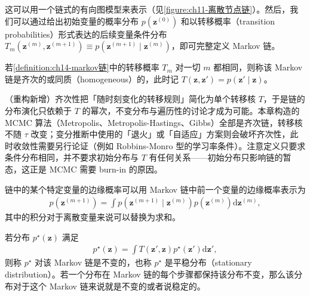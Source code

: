 \documentclass[../../main.tex]{subfiles}
\begin{document}
这可以用一个链式的有向图模型来表示（见\cref{figure:ch11-离散节点链}）。然后，我们可以通过给出初始变量的概率分布 $p\!\left(\bm{z}^{(0)}\right)$ 和以转移概率（transition probabilities）形式表达的后续变量条件分布 $T_{m}\!\left(\bm{z}^{(m)},\bm{z}^{(m+1)}\right)\equiv p\!\left(\bm{z}^{(m+1)}\mid\bm{z}^{(m)}\right)$，即可完整定义 Markov 链。

\begin{definition}[齐次 Markov 链]\label{definition:ch14-齐次markov链}
若\cref{definition:ch14-markov链}中的转移概率 $T_{m}$ 对一切 $m$ 都相同，则称该 Markov 链是齐次的或同质（homogeneous）的，此时记 $T\!\left(\bm{z},\bm{z}'\right)=p\!\left(\bm{z}'\mid\bm{z}\right)$。
\end{definition}

\begin{remark}（重构新增）齐次性把「随时刻变化的转移规则」简化为单个转移核 $T$，于是链的分布演化只依赖于 $T$ 的幂次，不变分布与遍历性的讨论才成为可能。本章构造的 MCMC 算法（Metropolis、Metropolis-Hastings、Gibbs）全部是齐次链，转移核不随 $\tau$ 改变；变分推断中使用的「退火」或「自适应」方案则会破坏齐次性，此时收敛性需要另行论证（例如 Robbins-Monro 型的学习率条件）。注意定义只要求条件分布相同，并不要求初始分布与 $T$ 有任何关系——初始分布只影响链的暂态，这正是 MCMC 需要 burn-in 的原因。
\end{remark}

链中的某个特定变量的边缘概率可以用 Markov 链中前一个变量的边缘概率表示为
\begin{align}
p\!\left(\bm{z}^{(m+1)}\right)=\int p\!\left(\bm{z}^{(m+1)}\mid\bm{z}^{(m)}\right)p\!\left(\bm{z}^{(m)}\right)\mathrm{d}\bm{z}^{(m)},
\label{align:ch14-链边缘}
\end{align}
其中的积分对于离散变量来说可以替换为求和。

\begin{definition}[不变分布]\label{definition:ch14-不变分布}
若分布 $p^{\star}(\bm{z})$ 满足
\begin{align}
p^{\star}(\bm{z})=\int T\!\left(\bm{z}',\bm{z}\right)p^{\star}\!\left(\bm{z}'\right)\mathrm{d}\bm{z}',
\label{align:ch14-不变分布}
\end{align}
则称 $p^{\star}$ 对该 Markov 链是不变的，也称 $p^{\star}$ 是平稳分布（stationary distribution）。若一个分布在 Markov 链的每个步骤都保持该分布不变，那么该分布对于这个 Markov 链来说就是不变的或者说稳定的。
\end{definition}
\end{document}
